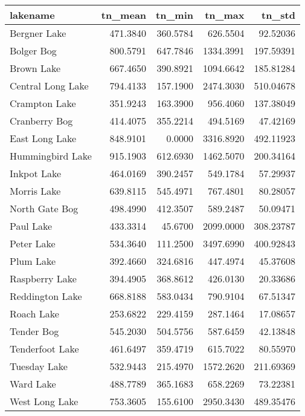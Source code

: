 \documentclass[]{article}
\begin{document}
\begin{tabular}{l|r|r|r|r}
\hline
lakename & tn\_mean & tn\_min & tn\_max & tn\_std\\
\hline
Bergner Lake & 471.3840 & 360.5784 & 626.5504 & 92.52036\\
\hline
Bolger Bog & 800.5791 & 647.7846 & 1334.3991 & 197.59391\\
\hline
Brown Lake & 667.4650 & 390.8921 & 1094.6642 & 185.81284\\
\hline
Central Long Lake & 794.4133 & 157.1900 & 2474.3030 & 510.04678\\
\hline
Crampton Lake & 351.9243 & 163.3900 & 956.4060 & 137.38049\\
\hline
Cranberry Bog & 414.4075 & 355.2214 & 494.5169 & 47.42169\\
\hline
East Long Lake & 848.9101 & 0.0000 & 3316.8920 & 492.11923\\
\hline
Hummingbird Lake & 915.1903 & 612.6930 & 1462.5070 & 200.34164\\
\hline
Inkpot Lake & 464.0169 & 390.2457 & 549.1784 & 57.29937\\
\hline
Morris Lake & 639.8115 & 545.4971 & 767.4801 & 80.28057\\
\hline
North Gate Bog & 498.4990 & 412.3507 & 589.2487 & 50.09471\\
\hline
Paul Lake & 433.3314 & 45.6700 & 2099.0000 & 308.23787\\
\hline
Peter Lake & 534.3640 & 111.2500 & 3497.6990 & 400.92843\\
\hline
Plum Lake & 392.4660 & 324.6816 & 447.4974 & 45.37608\\
\hline
Raspberry Lake & 394.4905 & 368.8612 & 426.0130 & 20.33686\\
\hline
Reddington Lake & 668.8188 & 583.0434 & 790.9104 & 67.51347\\
\hline
Roach Lake & 253.6822 & 229.4159 & 287.1464 & 17.08657\\
\hline
Tender Bog & 545.2030 & 504.5756 & 587.6459 & 42.13848\\
\hline
Tenderfoot Lake & 461.6497 & 359.4719 & 615.7022 & 80.55970\\
\hline
Tuesday Lake & 532.9443 & 215.4970 & 1572.2620 & 211.69369\\
\hline
Ward Lake & 488.7789 & 365.1683 & 658.2269 & 73.22381\\
\hline
West Long Lake & 753.3605 & 155.6100 & 2950.3430 & 489.35476\\
\hline
\end{tabular}
\end{document}
